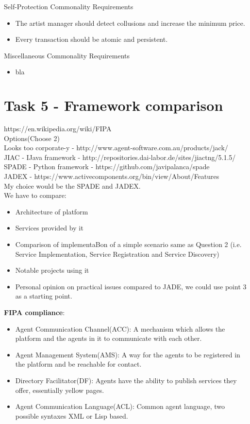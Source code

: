 \documentclass[a4paper, 11pt]{article}
\begin{document}
Self-Protection Commonality Requirements
\begin{itemize}
\item The artist manager should detect collusions and increase the minimum price.
\item Every transaction should be atomic and persistent.
\end{itemize}

Miscellaneous Commonality Requirements
\begin{itemize}
\item bla
\end{itemize}

\section{Task 5 - Framework comparison}

https://en.wikipedia.org/wiki/FIPA \\
Options(Choose 2) \\
Looks too corporate-y - http://www.agent-software.com.au/products/jack/ \\
JIAC - IJava framework - http://repositories.dai-labor.de/sites/jiactng/5.1.5/ \\
SPADE - Python framework - https://github.com/javipalanca/spade \\
JADEX - https://www.activecomponents.org/bin/view/About/Features \\

My choice would be the SPADE and JADEX. \\

We have to compare:
\begin{itemize}
	\item Architecture of platform
	\item Services provided by it
	\item Comparison of implementaBon of a simple scenario	same as	Question 2 (i.e.	Service Implementation,	Service	Registration and Service Discovery)
	\item Notable projects using it
	\item Personal opinion on practical issues compared to JADE, we could use point 3 as a starting point.
\end{itemize}

\textbf{FIPA compliance}: 
\begin{itemize}
	\item Agent Communication Channel(ACC): A mechanism which allows the platform and the agents in it to communicate with each other.
	\item Agent Management System(AMS): A way for the agents to be registered in the platform and be reachable for contact.
	\item Directory Facilitator(DF): Agents have the ability to publish services they offer, essentially yellow pages.
	\item Agent Communication Language(ACL): Common agent language, two possible syntaxes XML or Lisp based.
\end{itemize}
\end{document}
